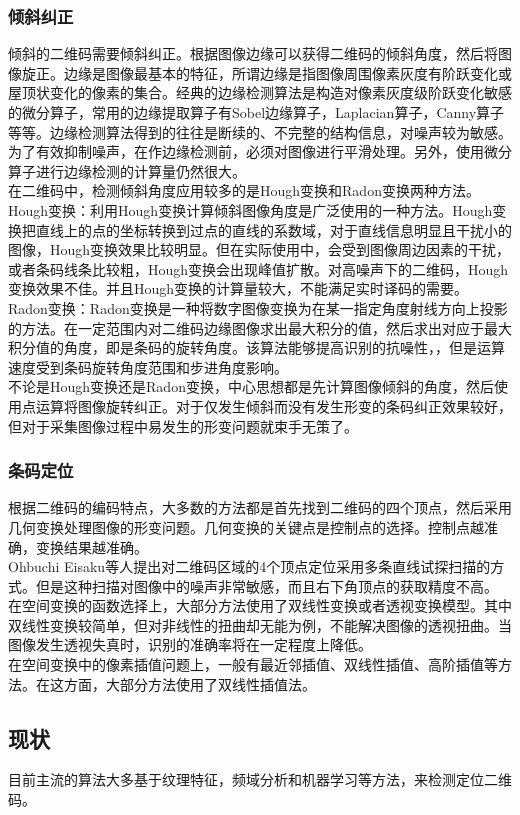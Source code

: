 \subsubsection{倾斜纠正}
倾斜的二维码需要倾斜纠正。根据图像边缘可以获得二维码的倾斜角度，然后将图像旋正。边缘是图像最基本的特征，所谓边缘是指图像周围像素灰度有阶跃变化或屋顶状变化的像素的集合。经典的边缘检测算法是构造对像素灰度级阶跃变化敏感的微分算子，常用的边缘提取算子有Sobel边缘算子，Laplacian算子，Canny算子等等\cite{7}。边缘检测算法得到的往往是断续的、不完整的结构信息，对噪声较为敏感。为了有效抑制噪声，在作边缘检测前，必须对图像进行平滑处理。另外，使用微分算子进行边缘检测的计算量仍然很大。\\
在二维码中，检测倾斜角度应用较多的是Hough变换和Radon变换两种方法。\\
Hough变换：利用Hough变换计算倾斜图像角度是广泛使用的一种方法。Hough变换把直线上的点的坐标转换到过点的直线的系数域，对于直线信息明显且干扰小的图像，Hough变换效果比较明显\cite{7}。但在实际使用中，会受到图像周边因素的干扰，或者条码线条比较粗，Hough变换会出现峰值扩散。对高噪声下的二维码，Hough变换效果不佳。并且Hough变换的计算量较大，不能满足实时译码的需要。\\
Radon变换：Radon变换是一种将数字图像变换为在某一指定角度射线方向上投影的方法\cite{7}。在一定范围内对二维码边缘图像求出最大积分的值，然后求出对应于最大积分值的角度，即是条码的旋转角度。该算法能够提高识别的抗噪性，，但是运算速度受到条码旋转角度范围和步进角度影响。\\
不论是Hough变换还是Radon变换，中心思想都是先计算图像倾斜的角度，然后使用点运算将图像旋转纠正。对于仅发生倾斜而没有发生形变的条码纠正效果较好，但对于采集图像过程中易发生的形变问题就束手无策了。

\subsubsection{条码定位}
根据二维码的编码特点，大多数的方法都是首先找到二维码的四个顶点，然后采用几何变换处理图像的形变问题。几何变换的关键点是控制点的选择。控制点越准确，变换结果越准确。\\
Ohbuchi Eisaku等人提出对二维码区域的4个顶点定位采用多条直线试探扫描的方式\cite{8}。但是这种扫描对图像中的噪声非常敏感，而且右下角顶点的获取精度不高。\\
在空间变换的函数选择上，大部分方法使用了双线性变换或者透视变换模型\cite{9}。其中双线性变换较简单，但对非线性的扭曲却无能为例，不能解决图像的透视扭曲。当图像发生透视失真时，识别的准确率将在一定程度上降低。\\
在空间变换中的像素插值问题上，一般有最近邻插值、双线性插值、高阶插值等方法\cite{7}。在这方面，大部分方法使用了双线性插值法。

\subsection{现状}
目前主流的算法大多基于纹理特征\cite{10}，频域分析\cite{11}和机器学习\cite{12}等方法，来检测定位二维码。